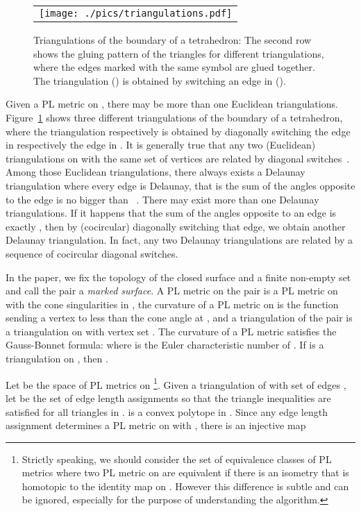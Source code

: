 \documentclass[11pt]{article}
\begin{document}
\begin{figure}[t]
\begin{center}
\begin{tabular}{c}
\texttt{[image: ./pics/triangulations.pdf]}
\end{tabular}
\end{center}
\vspace{-0.1in}
\caption{Triangulations of the boundary of a tetrahedron: The second row shows the gluing pattern of 
the triangles for different triangulations, where the edges marked with the same symbol are glued together. 
The triangulation  () is obtained by switching an edge in  (). 
\label{fig:triangulations}}
\end{figure}


Given a PL metric  on , there may be more than one Euclidean triangulations. 
Figure~\ref{fig:triangulations} shows three different triangulations of the boundary of a tetrahedron, 
where the triangulation  respectively  is obtained by diagonally switching the edge  in
 respectively the edge  in . It is generally true that any two (Euclidean) 
triangulations on  with the same set of vertices  are related by diagonal switches~\cite{Hatcher}. 
Among those Euclidean triangulations, there always exists a Delaunay triangulation where
every edge is Delaunay, that is the sum of the angles opposite to the edge is no bigger than ~\cite{Bobenko07}. 
There may exist more than one Delaunay triangulations.  If it happens that the sum of the angles 
opposite to an edge is exactly , then by (cocircular) diagonally switching that edge, 
we obtain another Delaunay triangulation. In fact, any two Delaunay triangulations are related by 
a sequence of cocircular diagonal switches. 


In the paper, we fix the topology of the closed surface  and a finite non-empty set 
and call the pair  a {\it marked surface}. A PL metric on the pair  is a PL metric
on  with the cone singularities in , the curvature of a PL metric on  is the function 
 sending a vertex  to  less than the cone angle at , and a 
triangulation of the pair  is a triangulation on  with vertex set . The curvature 
of a PL metric satisfies the Gauss-Bonnet formula:  where 
is the Euler characteristic number of . If  is a triangulation on , then 
. 

Let  be the space of PL metrics on  
\footnote{Strictly speaking, we should consider the set of equivalence classes of PL metrics where two PL metric
 on  are equivalent if there is an isometry  that is homotopic
to the identity map on . However this difference is subtle and can be ignored, especially for the purpose
of understanding the algorithm. }. Given a triangulation  of  with set of edges , let 
be the set of edge length assignments so that the triangle inequalities are satisfied for all triangles in . 
 is a convex polytope in . Since any edge length assignment  
determines a PL metric  on  with , there is an injective map 
\end{document}
